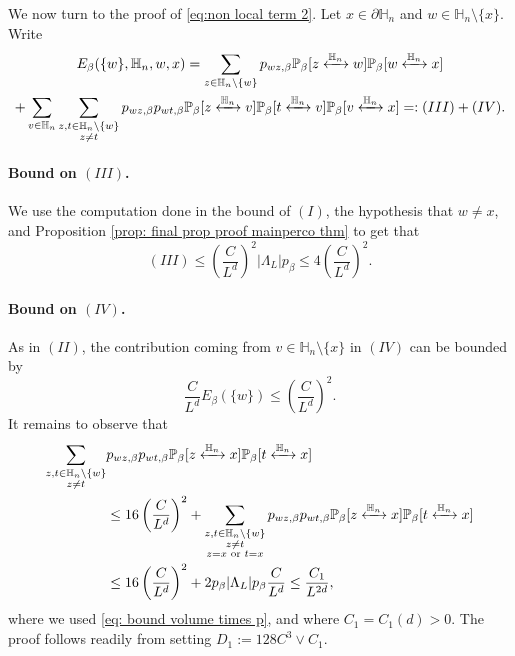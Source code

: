 \documentclass[11pt,a4paper]{article}
\numberwithin{equation}{section}
\theoremstyle{plain}
\theoremstyle{definition}
\newcommand{\connect}{\xleftrightarrow}
\begin{document}
We now turn to the proof of \eqref{eq:non local term 2}. Let $x\in \partial \mathbb H_n$ and $w\in \mathbb H_n\setminus \{x\}$. Write
\begin{multline}
	E_\beta(\{w\},\mathbb H_n,w,x)=\sum_{z\in \mathbb H_n\setminus \{ w\}}p_{wz,\beta}\mathbb P_\beta[z\connect{\mathbb H_n\:}w]\mathbb P_\beta[w\connect{\mathbb H_n\:}x]\\+\sum_{v\in \mathbb H_n}\sum_{\substack{z,t\in \mathbb H_n\setminus \{w\}\\z\neq t}}p_{wz,\beta}p_{wt,\beta}\mathbb P_\beta[z\connect{\mathbb H_n\:}v]\mathbb P_\beta[t\connect{\mathbb H_n\:}v]\mathbb P_\beta[v\connect{\mathbb H_n\:}x]=:(III)+(IV).
\end{multline}
\paragraph{Bound on $(III)$.} We use the computation done in the bound of $(I)$, the hypothesis that $w\neq x$, and Proposition \ref{prop: final prop proof mainperco thm} to get that
\begin{equation}
	(III)\leq \left(\frac{C}{L^d}\right)^2|\Lambda_L|p_\beta\leq 4\left(\frac{C}{L^d}\right)^2.
\end{equation}
\paragraph{Bound on $(IV)$.} As in $(II)$, the contribution coming from $v\in \mathbb H_n\setminus\{x\}$ in $(IV)$ can be bounded by
\begin{equation}
	\frac{C}{L^d}E_\beta(\{w\})\leq\left(\frac{C}{L^d}\right)^2.
\end{equation}
It remains to observe that
\begin{align}\notag
	\sum_{\substack{z,t\in \mathbb H_n\setminus\{w\}\\z\neq t}}&p_{wz,\beta}p_{wt,\beta}\mathbb P_\beta[z\connect{\mathbb H_n\:}x]\mathbb P_\beta[t\connect{\mathbb H_n\:}x]\\
	&\leq 16\left(\frac{C}{L^d}\right)^2+\sum_{\substack{z,t\in \mathbb H_n\setminus\{w\}\\z\neq t\\ z=x \text{ or }t=x}}p_{wz,\beta}p_{wt,\beta}\mathbb P_\beta[z\connect{\mathbb H_n\:}x]\mathbb P_\beta[t\connect{\mathbb H_n\:}x]\notag\\
	&\leq 16\left(\frac{C}{L^d}\right)^2+2p_\beta |\Lambda_L|p_\beta  \frac{C}{L^d}\leq \frac{C_1}{L^{2d}},
\end{align}
where we used \eqref{eq: bound volume times p}, and where $C_1=C_1(d)>0$. The proof follows readily from setting $D_1:=128C^3\vee C_1$.





\end{document}

